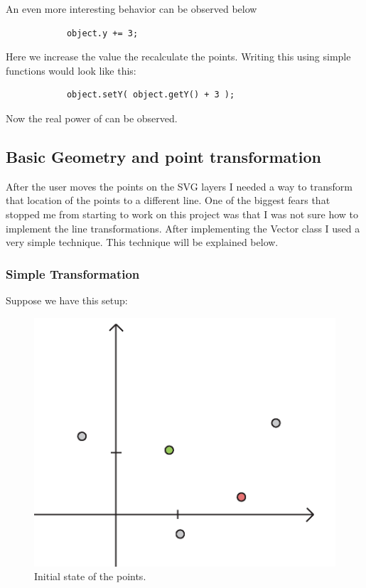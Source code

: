            An even more interesting behavior can be observed below
            \begin{lstlisting}
            object.y += 3;
            \end{lstlisting}
            Here we increase the  value the recalculate the points. Writing this using simple functions would look like this:
            \begin{lstlisting}
            object.setY( object.getY() + 3 );
            \end{lstlisting}

            Now the real power of  can be observed.

    \subsection{Basic Geometry and point transformation}

        After the user moves the points on the SVG layers I needed a way to transform that location of the points to a different line. 
        One of the biggest fears that stopped me from starting to work on this project was that I was not sure how to implement the line transformations. 
        After implementing the Vector class I used a very simple technique.
        This technique will be explained below.

        \subsubsection{Simple Transformation}

            Suppose we have this setup:

            \begin{figure}[ht]
                \centering
                \caption{Initial state of the points.}
                \includegraphics[scale=0.6]{img/explain01.png}
            \end{figure}

